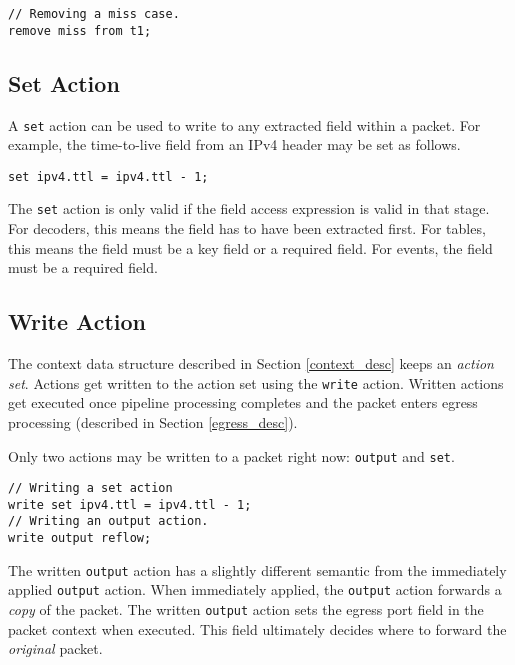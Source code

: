\begin{codepage}
\begin{lstlisting}
// Removing a miss case.
remove miss from t1;
\end{lstlisting}
\end{codepage}

\subsection{Set Action} \label{tut:set_action}

A \texttt{set} action can be used to write to any extracted field within a
packet. For example, the time-to-live field from an IPv4 header may be set as
follows.

\begin{codepage}
\begin{lstlisting}
set ipv4.ttl = ipv4.ttl - 1;
\end{lstlisting}
\end{codepage}

The \texttt{set} action is only valid if the field access expression is valid in
that stage. For decoders, this means the field has to have been extracted first.
For tables, this means the field must be a key field or a required field. For
events, the field must be a required field.

\subsection{Write Action} \label{tut:write_action}

The context data structure described in Section \ref{context_desc} keeps an
\textit{action set}. Actions get written to the action set using the
\texttt{write} action. Written actions get executed once pipeline processing
completes and the packet enters egress processing (described in Section \ref{egress_desc}).

Only two actions may be written to a packet right now: \texttt{output} and \texttt{set}.

\begin{lstlisting}
// Writing a set action
write set ipv4.ttl = ipv4.ttl - 1;
// Writing an output action.
write output reflow;
\end{lstlisting}

The written \texttt{output} action has a slightly different semantic from the immediately
applied \texttt{output} action. When immediately applied, the \texttt{output} action forwards a
\textit{copy} of the packet. The written \texttt{output} action sets the egress port field
in the packet context when executed. This field ultimately decides where to forward the
\textit{original} packet.

